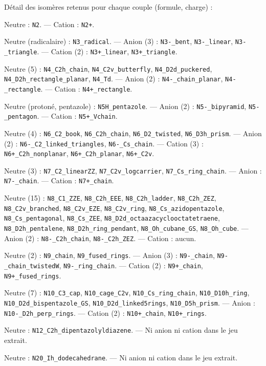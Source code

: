 \documentclass[11pt,a4paper]{article}
\begin{document}
D\'etail des isom\`eres retenus pour chaque couple (formule, charge) :

\begin{description}[leftmargin=1.4cm,itemsep=2pt,style=nextline]
\item[N$_2$] Neutre : \texttt{N2}. --- Cation : \texttt{N2+}.
\item[N$_3$] Neutre (radicalaire) : \texttt{N3\_radical}. --- Anion (3) :
  \texttt{N3-\_bent}, \texttt{N3-\_linear}, \texttt{N3-\_triangle}. ---
  Cation (2) : \texttt{N3+\_linear}, \texttt{N3+\_triangle}.
\item[N$_4$] Neutre (5) : \texttt{N4\_C2h\_chain}, \texttt{N4\_C2v\_butterfly},
  \texttt{N4\_D2d\_puckered}, \texttt{N4\_D2h\_rectangle\_planar},
  \texttt{N4\_Td}. --- Anion (2) : \texttt{N4-\_chain\_planar},
  \texttt{N4-\_rectangle}. --- Cation : \texttt{N4+\_rectangle}.
\item[N$_5$] Neutre (protoné, pentazole) : \texttt{N5H\_pentazole}. ---
  Anion (2) : \texttt{N5-\_bipyramid}, \texttt{N5-\_pentagon}. ---
  Cation : \texttt{N5+\_Vchain}.
\item[N$_6$] Neutre (4) : \texttt{N6\_C2\_book}, \texttt{N6\_C2h\_chain},
  \texttt{N6\_D2\_twisted}, \texttt{N6\_D3h\_prism}. --- Anion (2) :
  \texttt{N6-\_C2\_linked\_triangles}, \texttt{N6-\_Cs\_chain}. --- Cation
  (3) : \texttt{N6+\_C2h\_nonplanar}, \texttt{N6+\_C2h\_planar},
  \texttt{N6+\_C2v}.
\item[N$_7$] Neutre (3) : \texttt{N7\_C2\_linearZZ}, \texttt{N7\_C2v\_logcarrier},
  \texttt{N7\_Cs\_ring\_chain}. --- Anion : \texttt{N7-\_chain}. --- Cation :
  \texttt{N7+\_chain}.
\item[N$_8$] Neutre (15) : \texttt{N8\_C1\_ZZE}, \texttt{N8\_C2h\_EEE},
  \texttt{N8\_C2h\_ladder}, \texttt{N8\_C2h\_ZEZ}, \texttt{N8\_C2v\_branched},
  \texttt{N8\_C2v\_EZE}, \texttt{N8\_C2v\_ring},
  \texttt{N8\_Cs\_azidopentazole}, \texttt{N8\_Cs\_pentagonal},
  \texttt{N8\_Cs\_ZEE}, \texttt{N8\_D2d\_octaazacyclooctatetraene},
  \texttt{N8\_D2h\_pentalene}, \texttt{N8\_D2h\_ring\_pendant},
  \texttt{N8\_Oh\_cubane\_GS}, \texttt{N8\_Oh\_cube}. --- Anion (2) :
  \texttt{N8-\_C2h\_chain}, \texttt{N8-\_C2h\_ZEZ}. --- Cation : aucun.
\item[N$_9$] Neutre (2) : \texttt{N9\_chain}, \texttt{N9\_fused\_rings}. ---
  Anion (3) : \texttt{N9-\_chain}, \texttt{N9-\_chain\_twistedW},
  \texttt{N9-\_ring\_chain}. --- Cation (2) : \texttt{N9+\_chain},
  \texttt{N9+\_fused\_rings}.
\item[N$_{10}$] Neutre (7) : \texttt{N10\_C3\_cap}, \texttt{N10\_cage\_C2v},
  \texttt{N10\_Cs\_ring\_chain}, \texttt{N10\_D10h\_ring},
  \texttt{N10\_D2d\_bispentazole\_GS}, \texttt{N10\_D2d\_linked5rings},
  \texttt{N10\_D5h\_prism}. --- Anion : \texttt{N10-\_D2h\_perp\_rings}. ---
  Cation (2) : \texttt{N10+\_chain}, \texttt{N10+\_rings}.
\item[N$_{12}$] Neutre : \texttt{N12\_C2h\_dipentazolyldiazene}. --- Ni
  anion ni cation dans le jeu extrait.
\item[N$_{20}$] Neutre : \texttt{N20\_Ih\_dodecahedrane}. --- Ni anion ni
  cation dans le jeu extrait.
\end{description}
\end{document}

